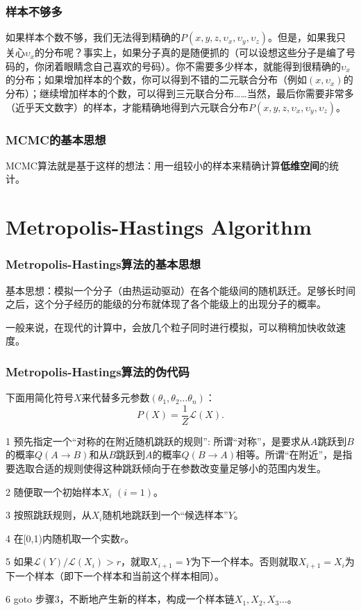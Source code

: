 \documentclass[CJK]{beamer}
\begin{document}
  \begin{frame}
    \frametitle{样本不够多}

 如果样本个数不够，我们无法得到精确的$P(x,y,z,\upsilon_x,\upsilon_y,\upsilon_z)$。但是，如果我只关心$\upsilon_x$的分布呢？事实上，如果分子真的是随便抓的（可以设想这些分子是编了号码的，你闭着眼睛念自己喜欢的号码）。你不需要多少样本，就能得到很精确的$\upsilon_x$的分布；如果增加样本的个数，你可以得到不错的二元联合分布（例如$(x,\upsilon_x)$的分布）；继续增加样本的个数，可以得到三元联合分布……当然，最后你需要非常多（近乎天文数字）的样本，才能精确地得到六元联合分布$P(x,y,z,\upsilon_x,\upsilon_y,\upsilon_z)$。
  \end{frame}


  \begin{frame}
    \frametitle{MCMC的基本思想}
    MCMC算法就是基于这样的想法：用一组较小的样本来精确计算{\bf 低维空间}的统计。
  \end{frame}


  \section{Metropolis-Hastings Algorithm}
  
  \begin{frame}
    \frametitle{Metropolis-Hastings算法的基本思想}

    基本思想：模拟一个分子（由热运动驱动）在各个能级间的随机跃迁。足够长时间之后，这个分子经历的能级的分布就体现了各个能级上的出现分子的概率。

    一般来说，在现代的计算中，会放几个粒子同时进行模拟，可以稍稍加快收敛速度。

  \end{frame}


  \begin{frame}
    \frametitle{Metropolis-Hastings算法的伪代码}
    
{\small    下面用简化符号$X$来代替多元参数$(\theta_1,\theta_2\ldots\theta_n)$：
    $$P(X) = \frac{1}{Z} \mathcal{L}(X).$$}

    {\scriptsize
    \bitem
  \item[1]{预先指定一个“对称的在附近随机跳跃的规则”: 所谓“对称”，是要求从$A$跳跃到$B$的概率$Q(A\rightarrow B)$和从$B$跳跃到$A$的概率$Q(B\rightarrow A)$相等。所谓“在附近”，是指要选取合适的规则使得这种跳跃倾向于在参数改变量足够小的范围内发生。}    
  \item[2]{随便取一个初始样本$X_i$ $(i=1)$。}
  \item[3]{按照跳跃规则，从$X_i$随机地跳跃到一个“候选样本”$Y$。}
  \item[4]{在[0,1)内随机取一个实数$r$。}
  \item[5]{如果$\mathcal{L}(Y)/\mathcal{L}(X_i) > r$，就取$X_{i+1}=Y$为下一个样本。否则就取$X_{i+1}=X_i$为下一个样本（即下一个样本和当前这个样本相同）。}
  \item[6]{goto 步骤3，不断地产生新的样本，构成一个样本链$X_1,X_2,X_3\ldots$。} 
    \eitem
}
  \end{frame}
\end{document}
